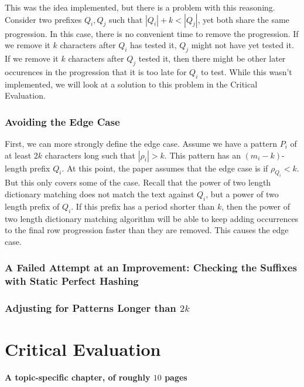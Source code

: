 \documentclass[ %
                    author={Dominic Joseph Moylett},
                    degree={MEng},
                     title={Dictionary Matching with Fingerprints},
                  subtitle={An Empirical Analysis},
                      type={Research},
                      year={2014} ]{dissertation}
\begin{document}
This was the idea implemented, but there is a problem with this reasoning. Consider two prefixes $Q_i, Q_j$ such that $|Q_i| + k < |Q_j|$, yet both share the same progression. In this case, there is no convenient time to remove the progression. If we remove it $k$ characters after $Q_i$ has tested it, $Q_j$ might not have yet tested it. If we remove it $k$ characters after $Q_j$ tested it, then there might be other later occurences in the progression that it is too late for $Q_i$ to test. While this wasn't implemented, we will look at a solution to this problem in the Critical Evaluation.

\subsection{Avoiding the Edge Case}

First, we can more strongly define the edge case. Assume we have a pattern $P_i$ of at least $2k$ characters long such that $|\rho_i| > k$. This pattern has an $(m_i - k)$-length prefix $Q_i$. At this point, the paper assumes that the edge case is if $\rho_{Q_i} < k$. But this only covers some of the case. Recall that the power of two length dictionary matching does not match the text against $Q_i$, but a power of two length prefix of $Q_i$. If this prefix has a period shorter than $k$, then the power of two length dictionary matching algorithm will be able to keep adding occurrences to the final row progression faster than they are removed. This causes the edge case.

\subsection{A Failed Attempt at an Improvement: Checking the Suffixes with Static Perfect Hashing}

\subsection{Adjusting for Patterns Longer than $2k$}


\chapter{Critical Evaluation}
\label{chap:evaluation}

{\bf A topic-specific chapter, of roughly $10$ pages} 
\vspace{1cm} 
\end{document}
